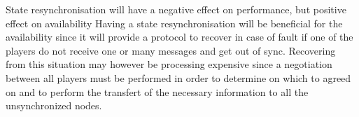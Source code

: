 
\begin{description}[style=nextline]
  \item[T1\label{t1}] State resynchronisation will have a negative effect on performance, but positive effect on availability
    \vspace{\baselineskip}
    \newline
    Having a state resynchronisation will be beneficial for the availability since it will provide a protocol to recover in case of fault if one of the players do not receive one or many messages and get out of sync. Recovering from this situation may however be processing expensive since a negotiation between all players must be performed in order to determine on which to agreed on and to perform the transfert of the necessary information to all the unsynchronized nodes.


\end{description}
